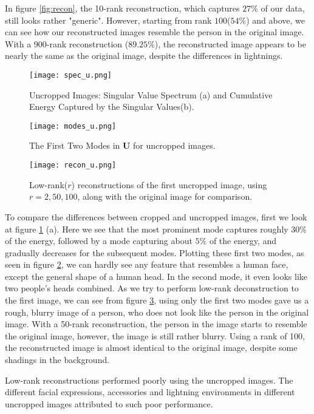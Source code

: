 \documentclass[12pt,a4paper]{article}
\begin{document}
In figure \ref{fig:recon}, the 10-rank reconstruction, which captures $27\%$ of our data, still looks rather "generic". However, starting from rank $100$($54\%$) and above, we can see how our reconstructed images resemble the person in the original image. With a 900-rank reconstruction ($89.25\%$), the reconstructed image appears to be nearly the same as the original image, despite the differences in lightnings.\\

\begin{figure}[H]
\texttt{[image: spec\_u.png]}
\caption{Uncropped Images: Singular Value Spectrum (a) and Cumulative Energy Captured by the Singular Values(b).}
\label{fig:spectrum_u}
\end{figure}

\begin{figure}[H]
\texttt{[image: modes\_u.png]}
\centering
\caption{The First Two Modes in $\mathbf{U}$ for uncropped images.}
\label{fig:modes_u}
\end{figure}

\begin{figure}[H]
\centering
\texttt{[image: recon\_u.png]}
\caption{Low-rank($r$) reconstructions of the first uncropped image, using $r = 2, 50, 100$, along with the original image for comparison.}
\label{fig:recon_u}
\end{figure}

To compare the differences between cropped and uncropped images, first we look at figure \ref{fig:spectrum_u} (a). Here we see that the most prominent mode captures roughly $30\%$ of the energy, followed by a mode capturing about $5\%$ of the  energy, and gradually decreases for the subsequent modes. Plotting these first two modes, as seen in figure \ref{fig:modes_u}, we can hardly see any feature that resembles a human face, except the general shape of a human head. In the second mode, it even looks like two people's heads combined. As we try to perform low-rank deconstruction to the first image, we can see from figure \ref{fig:recon_u}, using only the first two modes gave us a rough, blurry image of a person, who does not look like the person in the original image. With a 50-rank reconstruction, the person in the image starts to resemble the original image, however, the image is still rather blurry. Using a rank of 100, the reconstructed image is almost identical to the original image, despite some shadings in the background. 

Low-rank reconstructions performed poorly using the uncropped images. The different facial expressions, accessories and lightning environments in different uncropped images attributed to such poor performance.
\end{document}
